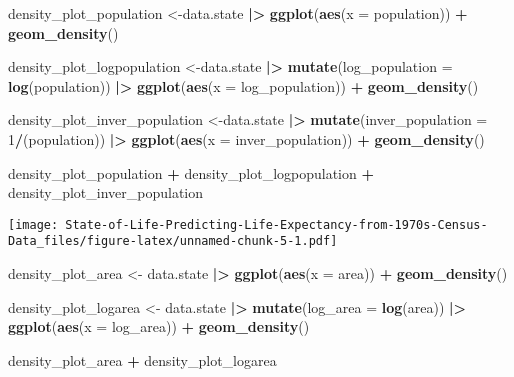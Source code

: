 \documentclass[
]{article}
\newenvironment{Shaded}{\begin{snugshade}}{\end{snugshade}}
\newcommand{\AttributeTok}[1]{\textcolor[rgb]{0.13,0.29,0.53}{#1}}
\newcommand{\DecValTok}[1]{\textcolor[rgb]{0.00,0.00,0.81}{#1}}
\newcommand{\FunctionTok}[1]{\textcolor[rgb]{0.13,0.29,0.53}{\textbf{#1}}}
\newcommand{\NormalTok}[1]{#1}
\newcommand{\OtherTok}[1]{\textcolor[rgb]{0.56,0.35,0.01}{#1}}
\newcommand{\SpecialCharTok}[1]{\textcolor[rgb]{0.81,0.36,0.00}{\textbf{#1}}}
\begin{document}
\begin{Shaded}
\begin{Highlighting}[]
\NormalTok{density\_plot\_population }\OtherTok{\textless{}{-}}\NormalTok{data.state }\SpecialCharTok{|\textgreater{}}
  \FunctionTok{ggplot}\NormalTok{(}\FunctionTok{aes}\NormalTok{(}\AttributeTok{x =}\NormalTok{ population)) }\SpecialCharTok{+}
  \FunctionTok{geom\_density}\NormalTok{()}

\NormalTok{density\_plot\_logpopulation }\OtherTok{\textless{}{-}}\NormalTok{data.state }\SpecialCharTok{|\textgreater{}}
  \FunctionTok{mutate}\NormalTok{(}\AttributeTok{log\_population =} \FunctionTok{log}\NormalTok{(population)) }\SpecialCharTok{|\textgreater{}}
  \FunctionTok{ggplot}\NormalTok{(}\FunctionTok{aes}\NormalTok{(}\AttributeTok{x =}\NormalTok{ log\_population)) }\SpecialCharTok{+} \FunctionTok{geom\_density}\NormalTok{()}

\NormalTok{density\_plot\_inver\_population }\OtherTok{\textless{}{-}}\NormalTok{data.state }\SpecialCharTok{|\textgreater{}}
  \FunctionTok{mutate}\NormalTok{(}\AttributeTok{inver\_population =} \DecValTok{1}\SpecialCharTok{/}\NormalTok{(population)) }\SpecialCharTok{|\textgreater{}}
  \FunctionTok{ggplot}\NormalTok{(}\FunctionTok{aes}\NormalTok{(}\AttributeTok{x =}\NormalTok{ inver\_population)) }\SpecialCharTok{+} \FunctionTok{geom\_density}\NormalTok{()}


\NormalTok{density\_plot\_population }\SpecialCharTok{+}\NormalTok{ density\_plot\_logpopulation }\SpecialCharTok{+}\NormalTok{ density\_plot\_inver\_population}
\end{Highlighting}
\end{Shaded}

\texttt{[image: State-of-Life-Predicting-Life-Expectancy-from-1970s-Census-Data\_files/figure-latex/unnamed-chunk-5-1.pdf]}

\begin{Shaded}
\begin{Highlighting}[]
\NormalTok{density\_plot\_area }\OtherTok{\textless{}{-}}\NormalTok{ data.state }\SpecialCharTok{|\textgreater{}}
  \FunctionTok{ggplot}\NormalTok{(}\FunctionTok{aes}\NormalTok{(}\AttributeTok{x =}\NormalTok{ area)) }\SpecialCharTok{+}
  \FunctionTok{geom\_density}\NormalTok{()}

\NormalTok{density\_plot\_logarea }\OtherTok{\textless{}{-}}\NormalTok{ data.state }\SpecialCharTok{|\textgreater{}}
  \FunctionTok{mutate}\NormalTok{(}\AttributeTok{log\_area =} \FunctionTok{log}\NormalTok{(area)) }\SpecialCharTok{|\textgreater{}}
  \FunctionTok{ggplot}\NormalTok{(}\FunctionTok{aes}\NormalTok{(}\AttributeTok{x =}\NormalTok{ log\_area)) }\SpecialCharTok{+} \FunctionTok{geom\_density}\NormalTok{()}

\NormalTok{density\_plot\_area }\SpecialCharTok{+}\NormalTok{ density\_plot\_logarea}
\end{Highlighting}
\end{Shaded}
\end{document}
